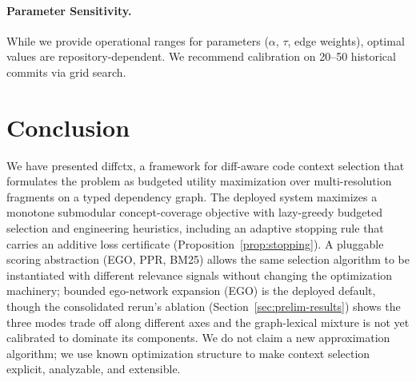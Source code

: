 \documentclass[11pt, a4paper]{article}
\begin{document}
\paragraph{Parameter Sensitivity.}
While we provide operational ranges for parameters ($\alpha$, $\tau$, edge weights), optimal values are repository-dependent. We recommend calibration on 20--50 historical commits via grid search.

\newpage
\section{Conclusion}

We have presented diffctx, a framework for diff-aware code context selection that formulates the problem as budgeted utility maximization over multi-resolution fragments on a typed dependency graph. The deployed system maximizes a monotone submodular concept-coverage objective with lazy-greedy budgeted selection and engineering heuristics, including an adaptive stopping rule that carries an additive loss certificate (Proposition~\ref{prop:stopping}). A pluggable scoring abstraction (EGO, PPR, BM25) allows the same selection algorithm to be instantiated with different relevance signals without changing the optimization machinery; bounded ego-network expansion (EGO) is the deployed default, though the consolidated rerun's ablation (Section~\ref{sec:prelim-results}) shows the three modes trade off along different axes and the graph-lexical mixture is not yet calibrated to dominate its components. We do not claim a new approximation algorithm; we use known optimization structure to make context selection explicit, analyzable, and extensible.
\end{document}
